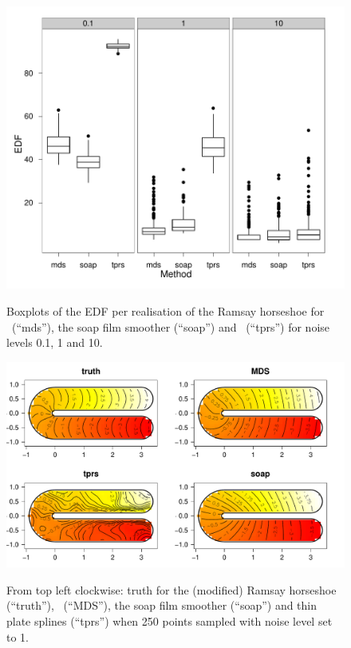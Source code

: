 \begin{figure}
\centering
\includegraphics[width=6in]{mds/figs/edf-mds-ramsay-boxplot.pdf} \\
\caption{Boxplots of the EDF per realisation of the Ramsay horseshoe for \mdsap\ (``mds''), the soap film smoother (``soap'') and \tprs\ (``tprs'') for noise levels 0.1, 1 and 10.}
\label{edf-mds-ramsay-boxplot}
\end{figure}


\begin{figure}
\centering
\includegraphics[width=6in]{mds/figs/ramsay-fit-1.pdf} \\
\caption{From top left clockwise: truth for the (modified) Ramsay horseshoe (``truth''), \mdsap\ (``MDS''), the soap film smoother (``soap'') and thin plate splines (``tprs'') when 250 points sampled with noise level set to 1.}
\label{mds-ramsay-fit-1}
\end{figure}

